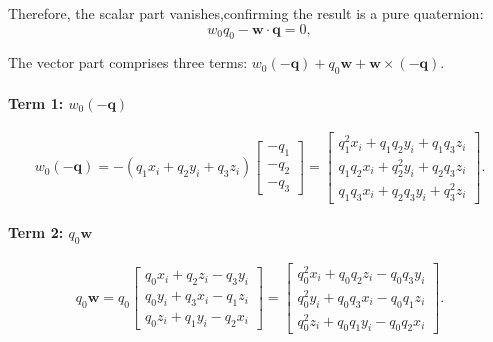 Therefore, the scalar part vanishes,confirming the result is a pure quaternion:
\begin{equation}
w_0 q_0 - \bm{w} \cdot \bm{q} = 0,
\end{equation}



The vector part comprises three terms: $w_0(-\bm{q}) + q_0\bm{w} + \bm{w} \times (-\bm{q})$.

\paragraph{Term 1: $w_0(-\bm{q})$}
\begin{equation}
w_0(-\bm{q}) = -(q_1 x_i + q_2 y_i + q_3 z_i)
\begin{bmatrix}
-q_1 \\ -q_2 \\ -q_3
\end{bmatrix}
=
\begin{bmatrix}
q_1^2 x_i + q_1 q_2 y_i + q_1 q_3 z_i \\
q_1 q_2 x_i + q_2^2 y_i + q_2 q_3 z_i \\
q_1 q_3 x_i + q_2 q_3 y_i + q_3^2 z_i
\end{bmatrix}.
\end{equation}

\paragraph{Term 2: $q_0\bm{w}$}
\begin{equation}
q_0\bm{w} = q_0
\begin{bmatrix}
q_0 x_i + q_2 z_i - q_3 y_i \\
q_0 y_i + q_3 x_i - q_1 z_i \\
q_0 z_i + q_1 y_i - q_2 x_i
\end{bmatrix}
=
\begin{bmatrix}
q_0^2 x_i + q_0 q_2 z_i - q_0 q_3 y_i \\
q_0^2 y_i + q_0 q_3 x_i - q_0 q_1 z_i \\
q_0^2 z_i + q_0 q_1 y_i - q_0 q_2 x_i
\end{bmatrix}.
\end{equation}


